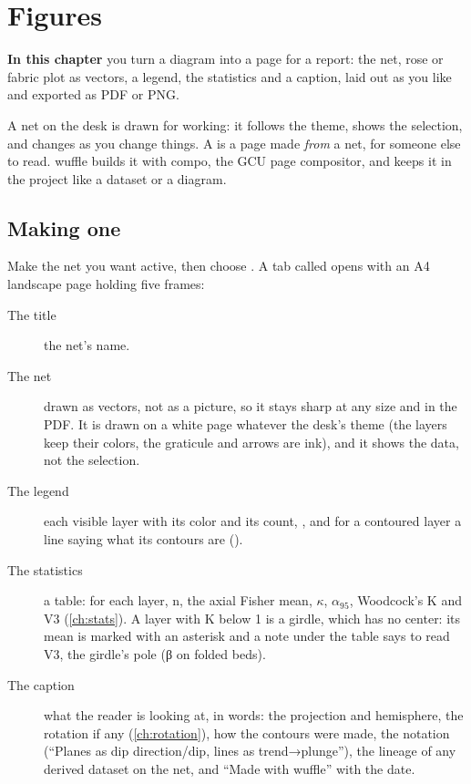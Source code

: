 \chapter{Figures}\label{ch:figures}
\begin{goals}
\textbf{In this chapter} you turn a diagram into a page for a report: the net, rose or fabric plot as
vectors, a legend, the statistics and a caption, laid out as you like and exported as PDF or PNG.
\end{goals}

A net on the desk is drawn for working: it follows the theme, shows the selection, and changes as you
change things. A  is a page made \emph{from} a net, for someone else to read. wuffle builds it
with compo, the GCU page compositor, and keeps it in the project like a dataset or a diagram.

\section{Making one}\label{sec:new-figure}

Make the net you want active, then choose . A tab called
 opens with an A4 landscape page holding five frames:

\begin{description}
\item[The title] the net's name.
\item[The net] drawn as vectors, not as a picture, so it stays sharp at any size and in the PDF. It is
drawn on a white page whatever the desk's theme (the layers keep their colors, the graticule and
arrows are ink), and it shows the data, not the selection.
\item[The legend] each visible layer with its color and its count, , and for a contoured
layer a line saying what its contours are ().
\item[The statistics] a table: for each layer, n, the axial Fisher mean, $\kappa$, $\alpha_{95}$,
Woodcock's K and V3 (\cref{ch:stats}). A layer with K below 1 is a girdle, which has no center: its mean is
marked with an asterisk and a note under the table says to read V3, the girdle's pole (β on folded beds).
\item[The caption] what the reader is looking at, in words: the projection and hemisphere, the rotation if
any (\cref{ch:rotation}), how the contours were made, the notation (\enquote{Planes as dip direction/dip,
lines as trend→plunge}), the lineage of any derived dataset on the net, and \enquote{Made with wuffle} with
the date.
\end{description}

